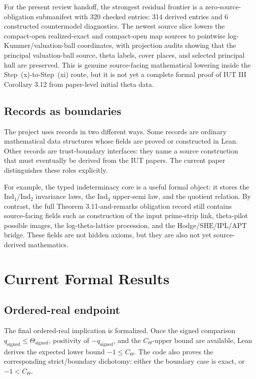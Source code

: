 \documentclass[11pt]{article}
\newcommand{\IUT}{IUT}
\newcommand{\CTheta}{C_\Theta}
\newcommand{\IndOne}{\ensuremath{\mathrm{Ind}_1}}
\newcommand{\IndTwo}{\ensuremath{\mathrm{Ind}_2}}
\newcommand{\IndThree}{\ensuremath{\mathrm{Ind}_3}}
\newcommand{\SHE}{\ensuremath{\mathrm{SHE}}}
\newcommand{\IPL}{\ensuremath{\mathrm{IPL}}}
\newcommand{\APT}{\ensuremath{\mathrm{APT}}}
\theoremstyle{plain}
\theoremstyle{definition}
\theoremstyle{remark}
\begin{document}
For the present review handoff, the strongest residual frontier is a
zero-source-obligation submanifest with 320 checked entries: 314 derived entries
and 6 constructed countermodel diagnostics.  The newest source slice lowers the
compact-open realized-exact and compact-open map sources to pointwise
log-Kummer/valuation-ball coordinates, with projection audits showing that the
principal valuation-ball source, theta labels, cover places, and selected
principal hull are preserved.  This is genuine source-facing mathematical
lowering inside the Step~(x)-to-Step~(xi) route, but it is not yet a complete
formal proof of \IUT{} III Corollary 3.12 from paper-level initial theta data.

\subsection{Records as boundaries}

The project uses records in two different ways.  Some records are ordinary
mathematical data structures whose fields are proved or constructed in Lean.
Other records are trust-boundary interfaces: they name a source construction
that must eventually be derived from the \IUT{} papers.  The current paper
distinguishes these roles explicitly.

For example, the typed indeterminacy core is a useful formal object: it stores
the \IndOne/\IndTwo{} invariance laws, the \IndThree{} upper-semi law, and the
quotient relation.  By contrast, the full Theorem 3.11-and-remarks obligation
record still contains source-facing fields such as construction of the input
prime-strip link, theta-pilot possible images, the log-theta-lattice
procession, and the Hodge/\(\SHE\)/\(\IPL\)/\(\APT\) bridge.  These fields are
not hidden axioms, but they are also not yet source-derived mathematics.

\section{Current Formal Results}

\subsection{Ordered-real endpoint}

The final ordered-real implication is formalized.  Once the signed comparison
\(q_{\mathrm{signed}}\le\Theta_{\mathrm{signed}}\), positivity of
\(-q_{\mathrm{signed}}\), and the \(\CTheta\)-upper bound are available, Lean
derives the expected lower bound \(-1\le \CTheta\).  The code also proves the
corresponding strict/boundary dichotomy: either the boundary case is exact, or
\(-1<\CTheta\).
\end{document}
